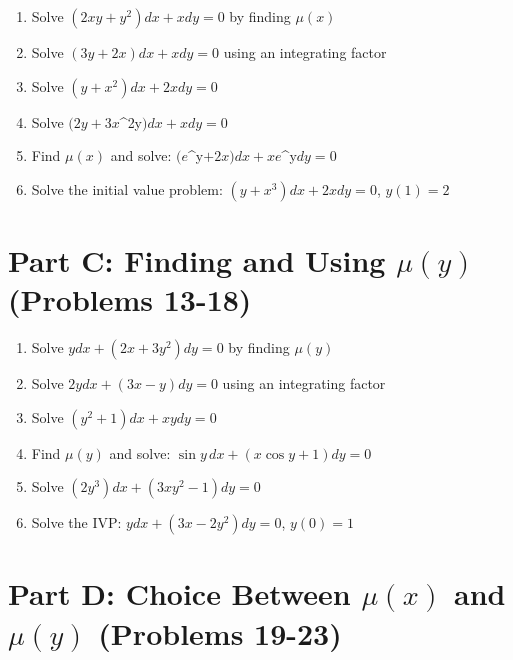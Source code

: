 \documentclass[12pt]{article}
\begin{document}
\begin{enumerate}[start=7]
\item Solve $(2xy + y^{2})dx + xdy = 0$ by finding $\mu(x)$

\item Solve $(3y + 2x)dx + xdy = 0$ using an integrating factor

\item Solve $(y + x^{2})dx + 2xdy = 0$

\item Solve $(2y + 3x$^{2y}$)dx + xdy = 0$

\item Find $\mu(x)$ and solve: $(e$^{y}$ + 2x)dx + xe$^{y}$ dy = 0$

\item Solve the initial value problem: $(y + x^{3})dx + 2xdy = 0$, $y(1) = 2$
\end{enumerate}

\section*{Part C: Finding and Using $\mu(y)$ (Problems 13-18)}

\begin{enumerate}[start=13]
\item Solve $ydx + (2x + 3y^{2})dy = 0$ by finding $\mu(y)$

\item Solve $2ydx + (3x - y)dy = 0$ using an integrating factor

\item Solve $(y^{2} + 1)dx + xydy = 0$

\item Find $\mu(y)$ and solve: $\sin y\,dx + (x\cos y + 1)dy = 0$

\item Solve $(2y^{3})dx + (3xy^{2} - 1)dy = 0$

\item Solve the IVP: $ydx + (3x - 2y^{2})dy = 0$, $y(0) = 1$
\end{enumerate}

\section*{Part D: Choice Between $\mu(x)$ and $\mu(y)$ (Problems 19-23)}
\end{document}

